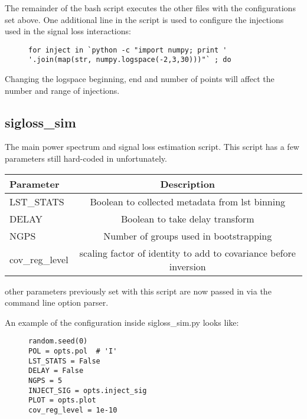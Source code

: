 \documentclass[onecolumn]{emulateapj}
\begin{document}
{{The remainder of the bash script executes the other files
with the configurations set above.
One additional line in the script is used to configure the 
injections used in the signal loss interactions:
\begin{figure}[h]
\centering
\begin{lstlisting}[firstnumber=40,name=sigloss_bash_v2.sh,
caption={sigloss\_bash\_v2.sh}]
    for inject in `python -c "import numpy; print ' '.join(map(str, numpy.logspace(-2,3,30)))"` ; do
\end{lstlisting}
\end{figure}

Changing the logspace beginning, end and number of points
will affect the number and range of injections.
}


\subsection{sigloss\_sim}{
The main power spectrum and signal loss estimation script.
This script has a few parameters still hard-coded in unfortunately.

\begin{table}[h]
\centering
\normalsize
\begin{tabular}{l | c}
Parameter & Description \\ \hline
LST\_STATS & Boolean to collected metadata from lst binning\\
DELAY & Boolean to take delay transform\\
NGPS & Number of groups used in bootstrapping\\
cov\_reg\_level & scaling factor of identity to add to covariance before inversion\\
\end{tabular}
\end{table}
other parameters previously set with this script are now
passed in via the command line option parser. 

An example of the configuration inside sigloss\_sim.py looks like: 

\begin{figure}[h]
\centering
\begin{lstlisting}[firstnumber=36,name=sigloss_sim.py,fontadjust,
linewidth=12cm,xleftmargin=.3\textwidth,caption={sigloss\_sim.py}]
random.seed(0)
POL = opts.pol  # 'I'
LST_STATS = False
DELAY = False
NGPS = 5
INJECT_SIG = opts.inject_sig
PLOT = opts.plot
cov_reg_level = 1e-10
\end{lstlisting}
\end{figure}


}}
\end{document}
